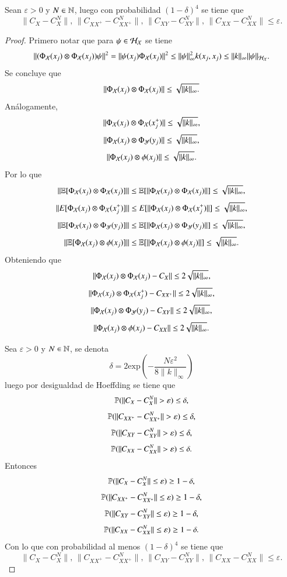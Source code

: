 \begin{prop}
    Sean $\varepsilon > 0$ y $N \in \N$, luego con probabilidad $(1-\delta)^4$ se tiene que
    \[
    \| C_{X} - C_{X}^N \|, \, \| C_{XX^+} - C_{XX^+}^N \|, \, \| C_{XY} - C_{XY}^N \|, \, \| C_{XX} - C_{XX}^N \| \leq \varepsilon.
    \]
\end{prop}

\begin{proof}
        Primero notar que para $\psi \in \H_\X$ se tiene
    \[
    \| (\Phi_\X (x_j) \otimes \Phi_\X (x_j))\psi \|^2 = \| \psi(x_j) \Phi_\X (x_j) \|^2 \leq \| \psi \|_\infty^2 k(x_j, x_j) \leq \| k \|_\infty \| \psi \|_{\H_\X}.
    \]
    Se concluye que
    \[ \| \Phi_\X (x_j) \otimes \Phi_\X (x_j) \| \leq  \sqrt{\| k \|_\infty.} \] 
    Análogamente,
    \[
    \| \Phi_\X (x_j) \otimes \Phi_\X (x_j^+) \| \leq \sqrt{\| k \|_\infty},
    \]
     \[
    \| \Phi_\X (x_j) \otimes \Phi_\Y (y_j) \| \leq \sqrt{\| k \|_\infty},
    \]
     \[
    \| \Phi_\X (x_j) \otimes \phi (x_j) \| \leq \sqrt{\| k \|_\infty}.
    \]
    Por lo que
    \[ \| \E[ \Phi_\X (x_j) \otimes \Phi_\X (x_j)] \| \leq  \E[ \| \Phi_\X (x_j) \otimes \Phi_\X (x_j) \| ] \leq \sqrt{\| k \|_\infty}, \] 
    \[
    \| E[ \Phi_\X (x_j) \otimes \Phi_\X (x_j^+)] \| \leq E[ \| \Phi_\X (x_j) \otimes \Phi_\X (x_j^+)\|]  \leq \sqrt{\| k \|_\infty},
    \]
     \[
    \| \E [\Phi_\X (x_j) \otimes \Phi_\Y (y_j)] \| \leq \E [\| \Phi_\X (x_j) \otimes \Phi_\Y (y_j) \|]  \leq \sqrt{\| k \|_\infty},
    \]
     \[ \| \E[ \Phi_\X (x_j) \otimes \phi (x_j)] \| \leq  \E[ \| \Phi_\X (x_j) \otimes \phi (x_j) \| ] \leq \sqrt{\| k \|_\infty}. \] 
     Obteniendo que
     \[
     \| \Phi_\X (x_j) \otimes \Phi_\X (x_j) - C_X \| \leq 2 \sqrt{\| k \|_\infty},
     \]
     \[
     \| \Phi_\X (x_j) \otimes \Phi_\X (x_j^+) - C_{XX^+} \| \leq 2 \sqrt{\| k \|_\infty},
     \]
     \[
     \| \Phi_\X (x_j) \otimes \Phi_\Y (y_j) - C_{XY} \| \leq 2 \sqrt{\| k \|_\infty},
     \]
    \[
     \| \Phi_\X (x_j) \otimes \phi (x_j) - C_{XX} \| \leq 2 \sqrt{\| k \|_\infty}.
     \]

     Sea $\varepsilon > 0$ y $N \in \N$, se denota
     \[
     \delta = 2 \text{exp} \left ( - \frac{N \varepsilon^2}{8 \| k \|_\infty} \right )
     \]
     luego por desigualdad de Hoeffding se tiene que
    \[
    \P ( \| C_{X} - C_{X}^N \| > \varepsilon ) \leq \delta,
    \]
    \[
    \P ( \| C_{XX^+} - C_{XX^+}^N \| > \varepsilon ) \leq \delta,
    \]
    \[
    \P ( \| C_{XY} - C_{XY}^N \| > \varepsilon ) \leq \delta,
    \]
    \[
    \P ( \| C_{XX} - C_{XX}^N \| > \varepsilon ) \leq \delta.
    \]
    Entonces
    \[
    \P ( \| C_{X} - C_{X}^N \| \leq \varepsilon ) \geq 1-\delta,
    \]
    \[
    \P ( \| C_{XX^+} - C_{XX^+}^N \| \leq \varepsilon ) \geq 1-\delta,
    \]
    \[
    \P ( \| C_{XY} - C_{XY}^N \| \leq \varepsilon ) \geq 1-\delta,
    \]
    \[
    \P ( \| C_{XX} - C_{XX}^N \| \leq \varepsilon ) \geq 1-\delta.
    \]
    Con lo que con probabilidad al menos $(1-\delta)^4$ se tiene que
    \[
    \| C_{X} - C_{X}^N \|, \, \| C_{XX^+} - C_{XX^+}^N \|, \, \| C_{XY} - C_{XY}^N \|, \, \| C_{XX} - C_{XX}^N \| \leq \varepsilon.
    \]
\end{proof}

